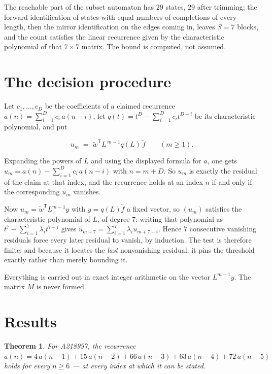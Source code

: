 \documentclass[11pt]{article}
\newtheorem{theorem}{Theorem}
\theoremstyle{definition}
\begin{document}
The reachable part of the subset automaton has $29$ states, $29$ after trimming; the forward identification of states with equal numbers of completions of every length, then the mirror identification on the edges coming in, leaves $S = 7$ blocks, and the count satisfies the linear recurrence given by the characteristic polynomial of that $7\times7$ matrix. The bound is computed, not assumed.

\section{The decision procedure}

Let $c_1,\dots,c_D$ be the coefficients of a claimed recurrence $a(n) = \sum_{i=1}^{D} c_i\,a(n-i)$, let $q(t) = t^{D} - \sum_{i=1}^{D} c_i t^{D-i}$ be its characteristic polynomial, and put

\[u_m \;=\; \tilde w^{\mathsf T} L^{\,m-1} q(L)\,\tilde f \qquad (m \ge 1).\]

Expanding the powers of $L$ and using the displayed formula for $a$, one gets $u_m = a(n) - \sum_{i=1}^{D} c_i\,a(n-i)$ with $n = m + D$. So $u_m$ is exactly the residual of the claim at that index, and the recurrence holds at an index $n$ if and only if the corresponding $u_m$ vanishes.

Now $u_m = \tilde w^{\mathsf T} L^{m-1} y$ with $y = q(L)\tilde f$ a fixed vector, so $(u_m)$ satisfies the characteristic polynomial of $L$, of degree $7$: writing that polynomial as $t^{7} - \sum_{i=1}^{7} \lambda_i t^{7-i}$ gives $u_{m+7} = \sum_{i=1}^{7} \lambda_i u_{m+7-i}$. Hence $7$ consecutive vanishing residuals force every later residual to vanish, by induction. The test is therefore finite; and because it locates the {\itshape last} nonvanishing residual, it pins the threshold exactly rather than merely bounding it.

Everything is carried out in exact integer arithmetic on the vector $L^{m-1}y$. The matrix $M$ is never formed.

\section{Results}

\begin{theorem} For A218997, the recurrence $a(n) = 4\,a(n-1) + 15\,a(n-2) + 66\,a(n-3) + 63\,a(n-4) + 72\,a(n-5)$ holds for every $n \ge 6$ --- at every index at which it can be stated.\end{theorem}
\end{document}
